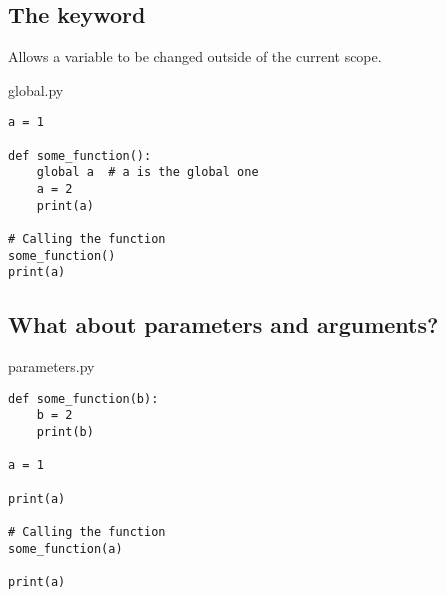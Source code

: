 \documentclass[aspectratio=1610,slidestop]{beamer}
\begin{document}
\subsection{The  keyword}
\begin{pframe}
 Allows a variable to be changed outside of the current scope.
 \pause
 \medskip

 \begin{minipage}[t]{0.60\textwidth}
  \begin{pythonfile}{global.py}
   \begin{verbatim}
a = 1

def some_function():
    global a  # a is the global one
    a = 2
    print(a)

# Calling the function
some_function()
print(a)
   \end{verbatim}
  \end{pythonfile}
 \end{minipage}\qquad
 \pause
 \begin{minipage}[t]{0.35\textwidth}
 \vspace{-4.95cm}
 \begin{terminal}
  \end{terminal}
 \end{minipage}
\end{pframe}


\subsection{What about parameters and arguments?}
\begin{pframe}
 \begin{minipage}[t]{0.50\textwidth}
  \begin{pythonfile}{parameters.py}
   \begin{verbatim}
def some_function(b):
    b = 2
    print(b)

a = 1

print(a)

# Calling the function
some_function(a)

print(a)
   \end{verbatim}
  \end{pythonfile}
 \end{minipage}\qquad
 \pause
 \begin{minipage}[t]{0.45\textwidth}
 \vspace{-5.65cm}
 \begin{terminal}
  \end{terminal}
 \end{minipage}
\end{pframe}
\end{document}

